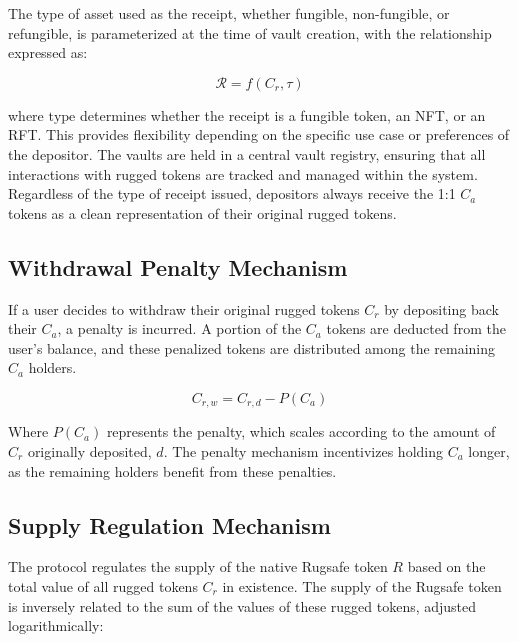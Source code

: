 \documentclass{article}
\begin{document}
The type of asset used as the receipt, whether fungible, non-fungible, or refungible, is parameterized at the time of vault creation, with the relationship expressed as:

\[
\mathcal{R} = f(C_r, \tau)
\]

where $\text{type}$ determines whether the receipt is a fungible token, an NFT, or an RFT. This provides flexibility depending on the specific use case or preferences of the depositor. The vaults are held in a central vault registry, ensuring that all interactions with rugged tokens are tracked and managed within the system. Regardless of the type of receipt issued, depositors always receive the 1:1 $C_a$ tokens as a clean representation of their original rugged tokens.








\subsection{Withdrawal Penalty Mechanism}
If a user decides to withdraw their original rugged tokens $C_r$ by depositing back their $C_a$, a penalty is incurred. A portion of the $C_a$ tokens are deducted from the user's balance, and these penalized tokens are distributed among the remaining $C_a$ holders.

\begin{equation}
C_{r,w} = C_{r,d} - P(C_a)
\end{equation}

Where $P(C_a)$ represents the penalty, which scales according to the amount of $C_r$ originally deposited, \(d\). The penalty mechanism incentivizes holding $C_a$ longer, as the remaining holders benefit from these penalties.
















\subsection{Supply Regulation Mechanism}
The protocol regulates the supply of the native Rugsafe token $R$ based on the total value of all rugged tokens $C_r$ in existence. The supply of the Rugsafe token is inversely related to the sum of the values of these rugged tokens, adjusted logarithmically:
\end{document}
